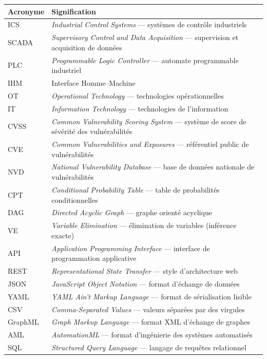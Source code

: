 \documentclass[12pt,a4paper]{article}
\renewcommand{\arraystretch}{1.3}
\begin{document}
\begin{footnotesize}
\renewcommand{\arraystretch}{1.15}
\begin{tabularx}{\textwidth}{p{2.6cm} X}
\toprule
\textbf{Acronyme} & \textbf{Signification} \\
\midrule
ICS & \emph{Industrial Control Systems} --- systèmes de contrôle industriels \\
SCADA & \emph{Supervisory Control and Data Acquisition} --- supervision et acquisition de données \\
PLC & \emph{Programmable Logic Controller} --- automate programmable industriel \\
IHM & Interface Homme--Machine \\
OT & \emph{Operational Technology} --- technologies opérationnelles \\
IT & \emph{Information Technology} --- technologies de l'information \\
CVSS & \emph{Common Vulnerability Scoring System} --- système de score de sévérité des vulnérabilités \\
CVE & \emph{Common Vulnerabilities and Exposures} --- référentiel public de vulnérabilités \\
NVD & \emph{National Vulnerability Database} --- base de données nationale de vulnérabilités \\
CPT & \emph{Conditional Probability Table} --- table de probabilités conditionnelles \\
DAG & \emph{Directed Acyclic Graph} --- graphe orienté acyclique \\
VE & \emph{Variable Elimination} --- élimination de variables (inférence exacte) \\
API & \emph{Application Programming Interface} --- interface de programmation applicative \\
REST & \emph{Representational State Transfer} --- style d'architecture web \\
JSON & \emph{JavaScript Object Notation} --- format d'échange de données \\
YAML & \emph{YAML Ain't Markup Language} --- format de sérialisation lisible \\
CSV & \emph{Comma-Separated Values} --- valeurs séparées par des virgules \\
GraphML & \emph{Graph Markup Language} --- format XML d'échange de graphes \\
AML & \emph{AutomationML} --- format d'ingénierie des systèmes automatisés \\
SQL & \emph{Structured Query Language} --- langage de requêtes relationnel \\

\end{tabularx}
\end{footnotesize}
\end{document}

